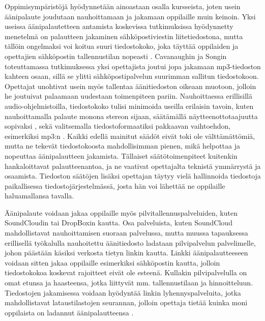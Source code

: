 \documentclass[utf8]{gradu3}
\begin{document}
Oppimisympäristöjä hyödynnetään ainoastaan osalla kursseista, joten usein äänipalaute joudutaan nauhoittamaan ja jakamaan oppilaille muin keinoin. Yksi useissa äänipalautetteen antamista koskevissa tutkimuksissa hyödynnetty menetelmä on palautteen jakaminen sähköpostiviestin liitetiedostona, mutta tällöin ongelmaksi voi koitua suuri tiedostokoko, joka täyttää oppilaiden ja opettajien sähköpostin tallennustilan nopeasti \parencite{developing}. Cavanaughin ja Songin \parencite*{versus} toteuttamassa tutkimuksessa yksi opettajista joutui jopa jakamaan mp3-tiedoston kahteen osaan, sillä se ylitti sähköpostipalvelun suurimman sallitun tiedostokoon. Opettajat unohtivat usein myös tallentaa äänitiedoston oikeaan muotoon, jolloin he joutuivat palaamaan uudestaan toimenpiteen pariin. Nauhoittaessa erillisillä audio-ohjelmistoilla, tiedostokoko tulisi minimoida useilla erilaisin tavoin, kuten nauhoittamalla palaute monona stereon sijaan, säätämällä näytteenottotaajuutta sopivaksi \parencite{voice}, sekä valitsemalla tiedostoformaatiksi pakkaavan vaihtoehdon, esimerkiksi mp3:n \parencite{engaging}. Kaikki edellä mainitut säädöt eivät toki ole välttämättömiä, mutta ne tekevät tiedostokoosta mahdollisimman pienen, mikä helpottaa ja nopeuttaa äänipalautteen jakamista. Tällaiset säätötoimenpiteet kuitenkin hankaloittavat palautteenantoa, ja ne vaativat opettajalta teknistä ymmärrystä ja osaamista. Tiedoston säätöjen lisäksi opettajan täytyy vielä hallinnoida tiedostoja paikallisessa tiedostojärjestelmässä, josta hän voi lähettää ne oppilaille haluamallansa tavalla.

Äänipalaute voidaan jakaa oppilaille myös pilvitallennuspalveluiden, kuten SoundCloudin tai DropBoxin kautta. Osa palveluista, kuten SoundCloud mahdollistavat nauhoittamisen suoraan palvelussa, mutta muussa tapauksessa erillisellä työkalulla nauhoitettu äänitiedosto ladataan pilvipalvelun palvelimelle, johon päästään käsiksi verkosta tietyn linkin kautta. Linkki äänipalautteeseen voidaan sitten jakaa oppilaille esimerkiksi sähköpostin kautta, jolloin tiedostokokoa koskevat rajoitteet eivät ole esteenä. Kullakin pilvipalvelulla on omat etunsa ja haasteensa, jotka liittyvät mm. tallennustilaan ja hinnoitteluun. Tiedostojen jakamisessa voidaan hyödyntää linkin lyhennyspalveluita, jotka mahdollistavat lataustilastojen seurannan, jolloin opettaja tietää kuinka moni oppilaista on ladannut äänipalautteensa \parencite{engaging}.
\end{document}

